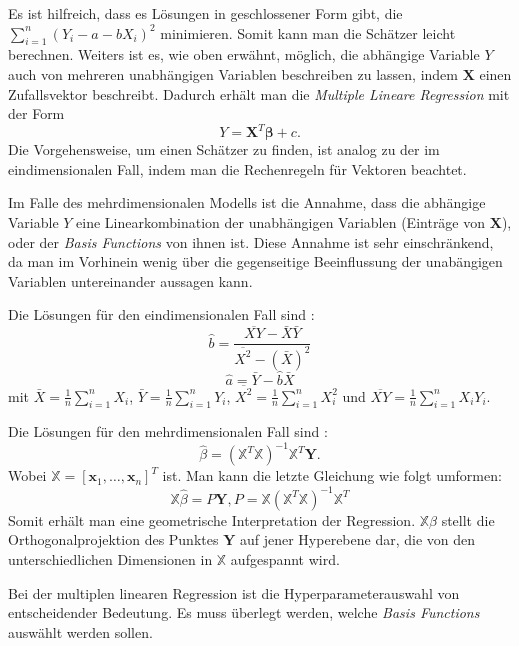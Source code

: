 Es ist hilfreich, dass es L\"osungen in geschlossener Form gibt, die $\sum_{i=1}^n (Y_i - a - bX_i)^2 $ minimieren. Somit kann man die Sch\"atzer leicht berechnen.
Weiters ist es, wie oben erw\"ahnt, m\"oglich, die abh\"angige Variable $Y$ auch von mehreren unabh\"angigen Variablen beschreiben zu lassen, indem $\mathbf{X}$ einen Zufallsvektor beschreibt.
Dadurch erh\"alt man die \textit{Multiple Lineare Regression}
mit der Form
$$ Y = \mathbf{X}^T\mathbf{\beta} + c. $$
Die Vorgehensweise, um einen Sch\"atzer zu finden, ist analog zu der im eindimensionalen Fall, indem man die Rechenregeln f\"ur Vektoren beachtet.

Im Falle des mehrdimensionalen Modells ist die Annahme, dass die \glqq abh\"angige\grqq{} Variable $Y$ eine Linearkombination der \glqq unabh\"angigen\grqq{} Variablen
(Eintr\"age von $\mathbf{X}$), oder der \textit{Basis Functions} von ihnen ist. Diese Annahme ist sehr einschr\"ankend, da man im Vorhinein wenig \"uber die gegenseitige Beeinflussung der
\glqq unab\"angigen\grqq{} Variablen untereinander aussagen kann.

Die L\"osungen f\"ur den eindimensionalen Fall sind \cite[Kapitel 13, Satz 13.4]{wasserman}:
$$ \hat{b} = \frac{\overline{XY} - \bar{X}\bar{Y}}{\overline{X^2} - (\bar{X})^2} $$
$$ \hat{a} = \bar{Y} - \hat{b}\bar{X} $$
mit $\bar{X} = \frac{1}{n} \sum_{i = 1}^n X_i$, $\bar{Y} = \frac{1}{n} \sum_{i = 1}^n Y_i$, $\overline{X^2} = \frac{1}{n} \sum_{i = 1}^n X_i^2$ und $\overline{XY} = \frac{1}{n} \sum_{i = 1}^n X_iY_i$.

Die L\"osungen f\"ur den mehrdimensionalen Fall sind \cite[Kapitel 13, Satz 13.13]{wasserman}:
$$  \hat{\beta} = (\mathbb{X}^T\mathbb{X})^{-1}\mathbb{X}^T\mathbf{Y} .$$
Wobei $\mathbb{X} = [\mathbf{x}_1, \dots, \mathbf{x}_n]^T$ ist. Man kann die letzte Gleichung wie folgt umformen:
$$ \mathbb{X}\hat{\beta} = P\mathbf{Y}, P = \mathbb{X}(\mathbb{X}^T\mathbb{X})^{-1}\mathbb{X}^T $$
Somit erh\"alt man eine geometrische Interpretation der Regression. $\mathbb{X}\hat{\beta}$ stellt die Orthogonalprojektion des Punktes $\mathbf{Y}$ auf jener
Hyperebene dar, die von den unterschiedlichen Dimensionen in $\mathbb{X}$ aufgespannt wird.

Bei der multiplen linearen Regression ist die Hyperparameterauswahl von entscheidender Bedeutung. Es muss \"uberlegt werden, welche
\textit{Basis Functions} ausw\"ahlt werden sollen.






























